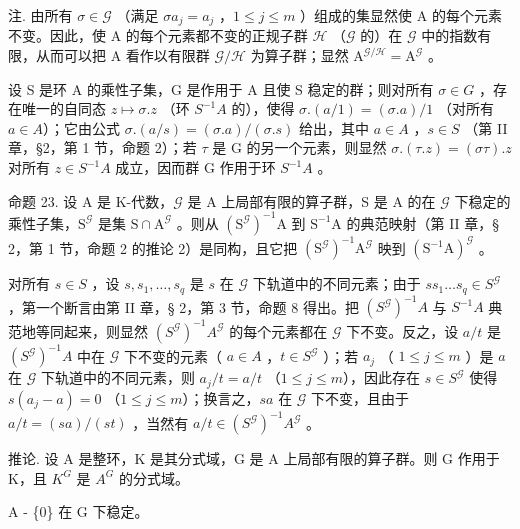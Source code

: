 注. 由所有 \(\sigma \in \mathcal{G}\) （满足 \(\sigma a_{j} = a_{j}\) ，\(1 \leqslant j \leqslant m\) ）组成的集显然使 A 的每个元素不变。因此，使 A 的每个元素都不变的正规子群 \(\mathcal{H}\) （\(\mathcal{G}\) 的）在 \(\mathcal{G}\) 中的指数有限，从而可以把 A 看作以有限群 \(\mathcal{G}/\mathcal{H}\) 为算子群；显然 \(\mathrm{A}^{\mathcal{G}/\mathcal{H}} = \mathrm{A}^{\mathcal{G}}\) 。

设 S 是环 A 的乘性子集，G 是作用于 A 且使 S 稳定的群；则对所有 \(\sigma\in G\) ，存在唯一的自同态 \(z\mapsto\sigma.z\) （环 \(S^{-1}A\) 的），使得 \(\sigma.(a/1)=(\sigma.a)/1\) （对所有 \(a\in A\)）；它由公式 \(\sigma.(a/s)=(\sigma.a)/( \sigma.s)\) 给出，其中 \(a\in A\) ，\(s\in S\) （第 II 章，§2，第 1 节，命题 2）；若 \(\tau\) 是 G 的另一个元素，则显然 \(\sigma.(\tau.z)=(\sigma\tau).z\) 对所有 \(z\in S^{-1}A\) 成立，因而群 G 作用于环 \(S^{-1}A\) 。

命题 23. 设 A 是 K-代数，\(\mathcal{G}\) 是 A 上局部有限的算子群，S 是 A 的在 \(\mathcal{G}\) 下稳定的乘性子集，\(\mathrm{S}^{\mathcal{G}}\) 是集 \(\mathrm{S} \cap \mathrm{A}^{\mathcal{G}}\) 。则从 \((\mathrm{S}^{\mathcal{G}})^{-1}\mathrm{A}\) 到 \(\mathrm{S}^{-1}\mathrm{A}\) 的典范映射（第 II 章，§ 2，第 1 节，命题 2 的推论 2）是同构，且它把 \((\mathrm{S}^{\mathcal{G}})^{-1}\mathrm{A}^{\mathcal{G}}\) 映到 \((\mathrm{S}^{-1}\mathrm{A})^{\mathcal{G}}\) 。

对所有 \(s \in S\) ，设 \(s, s_1, \ldots, s_q\) 是 \(s\) 在 \(\mathcal{G}\) 下轨道中的不同元素；由于 \(ss_1 \ldots s_q \in S^{\mathcal{G}}\) ，第一个断言由第 II 章，§ 2，第 3 节，命题 8 得出。把 \((S^{\mathcal{G}})^{-1}A\) 与 \(S^{-1}A\) 典范地等同起来，则显然 \((S^{\mathcal{G}})^{-1}A^{\mathcal{G}}\) 的每个元素都在 \(\mathcal{G}\) 下不变。反之，设 \(a/t\) 是 \((S^{\mathcal{G}})^{-1}A\) 中在 \(\mathcal{G}\) 下不变的元素（ \(a \in A\) ，\(t \in S^{\mathcal{G}}\) ）；若 \(a_j\) （ \(1 \leqslant j \leqslant m\) ）是 \(a\) 在 \(\mathcal{G}\) 下轨道中的不同元素，则 \(a_j/t = a/t\) （\(1 \leqslant j \leqslant m\)），因此存在 \(s \in S^{\mathcal{G}}\) 使得 \(s(a_j - a) = 0\) （\(1 \leqslant j \leqslant m\)）；换言之，\(sa\) 在 \(\mathcal{G}\) 下不变，且由于 \(a/t = (sa)/(st)\) ，当然有 \(a/t \in (S^{\mathcal{G}})^{-1}A^{\mathcal{G}}\) 。

推论. 设 A 是整环，K 是其分式域，G 是 A 上局部有限的算子群。则 G 作用于 K，且 \(K^{G}\) 是 \(A^{G}\) 的分式域。

A - \{0\} 在 G 下稳定。

